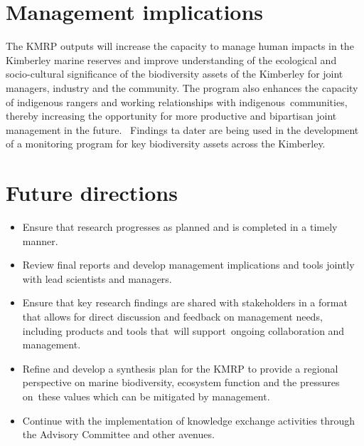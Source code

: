 \documentclass[version=last,
    paper=a4, %
    10pt, %
    usenames,
    dvipsnames,
    oneside, %
    headings=openany, %
    DIV=15 %
]{scrbook}
\begin{document}
\section*{Management implications}
The KMRP outputs will increase the capacity to manage human impacts in
the Kimberley marine reserves and improve understanding of the
ecological and socio-cultural significance of the biodiversity assets of
the Kimberley for joint managers, industry and the community. The
program also enhances the capacity of indigenous rangers and working
relationships with indigenous~communities, thereby increasing the
opportunity for more productive and bipartisan joint management in the
future. ~Findings ta dater are being used in the development of a
monitoring program for key biodiversity assets across the Kimberley.



\section*{Future directions}
\begin{itemize}
\itemsep1pt\parskip0pt
\item
  Ensure that research progresses as planned and is completed in a
  timely manner.
\item
  Review final reports and develop management implications and tools
  jointly with lead scientists and managers.
\item
  Ensure that key research findings are shared with stakeholders in a
  format that allows for direct discussion and feedback on management
  needs, including products and tools that~will support~ongoing
  collaboration and management.~
\item
  Refine and develop a synthesis plan for the KMRP to provide a regional
  perspective on marine biodiversity, ecosystem function and the
  pressures on~these values which can be mitigated by management.
\item
  Continue with the implementation of knowledge exchange activities
  through the Advisory Committee and other avenues.
\end{itemize}



\end{document}
